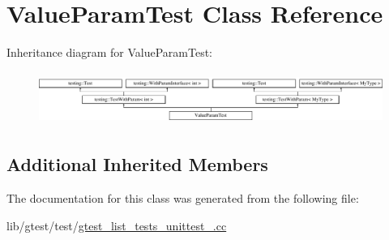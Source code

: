 \hypertarget{class_value_param_test}{\section{Value\-Param\-Test Class Reference}
\label{class_value_param_test}
}
Inheritance diagram for Value\-Param\-Test\-:\begin{figure}[H]
\begin{center}
\leavevmode
\includegraphics[height=1.735537cm]{class_value_param_test}
\end{center}
\end{figure}
\subsection*{Additional Inherited Members}


The documentation for this class was generated from the following file\-:\begin{DoxyCompactItemize}
\item 
lib/gtest/test/\hyperlink{gtest__list__tests__unittest___8cc}{gtest\-\_\-list\-\_\-tests\-\_\-unittest\-\_\-.\-cc}\end{DoxyCompactItemize}

